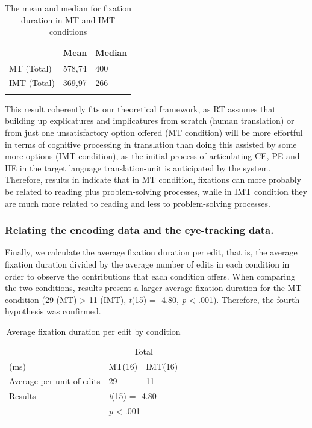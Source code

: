 \documentclass[output=paper]{langsci/langscibook}
\begin{document}
\begin{table}
\begin{tabular}{lll}
\lsptoprule
& Mean & Median\\
\midrule
MT (Total) & 578,74 & 400\\
IMT (Total) & 369,97 & 266\\
\lspbottomrule
\end{tabular}
\caption{The mean and median for fixation duration in MT and IMT conditions}
\label{sarto:tab:4}
\end{table}


This result coherently fits our theoretical framework, as RT assumes that building up explicatures and implicatures from scratch (human translation) or from just one unsatisfactory option offered (MT condition) will be more effortful in terms of cognitive processing in translation than doing this assisted by some more options (IMT condition), as the initial process of articulating CE, PE and HE in the target language translation-unit is anticipated by the system. Therefore, results in  indicate that in MT condition, fixations can more probably be related to reading plus problem-solving processes, while in IMT condition they are much more related to reading and less to problem-solving processes.


\subsubsection{Relating the encoding data and the eye-tracking data.}

Finally, we calculate the average fixation duration per edit, that is, the average fixation duration divided by the average number of edits in each condition in order to observe the contributions that each condition offers. When comparing the two conditions, results present a larger average fixation duration for the MT condition                 (29 (MT) {\textgreater} 11 (IMT), \textit{t}(15) = -4.80, \textit{p} {\textless} .001). Therefore, the fourth hypothesis was confirmed.

\begin{table}
\begin{tabular}{lll}
\lsptoprule
 & \multicolumn{2}{c}{Total}\\
(ms) & {  MT(16)} &   IMT(16)\\
\midrule
Average per unit of edits & {29} & 11\\
Results & \multicolumn{2}{l}{\textit{t}(15) = -4.80}\\
& \multicolumn{2}{l}{ \textit{p} {\textless} .001}\\ 
\lspbottomrule
\end{tabular}
\caption{Average fixation duration per edit by condition}
\label{sarto:tab:5}
\end{table}
\end{document}
